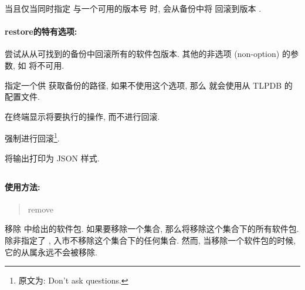 当且仅当同时指定  与一个可用的版本号  时, \tlmgr 会从备份中将  回滚到版本 .

\paragraph{\textmd{\ac{restore}}的特有选项:}
\begin{description}
    \item {}\par
    尝试从从可找到的备份中回滚所有的软件包版本. 其他的非选项 (non-option) 的参数, 如  将不可用.
    \item {} \par
    指定一个供 \tlmgr 获取备份的路径, 如果不使用这个选项, 那么 \tlmgr 就会使用从 TLPDB 的配置文件. 
    \item {}\par
    在终端显示将要执行的操作, 而不进行回滚.
    \item {}\par
    强制进行回滚\footnote{原文为: Don't ask questions.}.
    \item {}\par
    将输出打印为 JSON 样式. 
\end{description}

\clearpage

\subsection{}\label{subsec:remove}

\paragraph{使用方法:}

\begin{quote}
    \tlmgr{} \ac{remove} 
\end{quote}

移除  中给出的软件包. 如果要移除一个集合, 那么将移除这个集合下的所有软件包. 除非指定了 , 入市不移除这个集合下的任何集合. 然而, 当移除一个软件包的时候, 它的从属永远不会被移除. 

